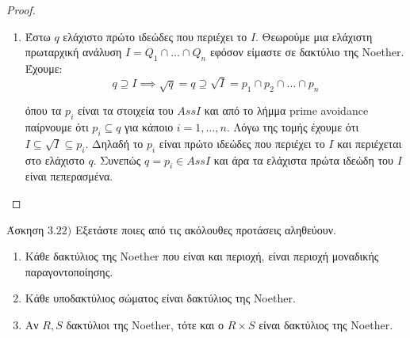 \documentclass[oneside,a4paper]{article}
\newcommand {\tl}{\textlatin}
\begin{document}
\begin{proof}
\begin{enumerate}
		
		\item Έστω $q$ ελάχιστο πρώτο ιδεώδες που περιέχει το $I$. Θεωρούμε μια ελάχιστη πρωταρχική ανάλυση $I = Q_1 \cap \ldots \cap Q_n$ εφόσον είμαστε σε δακτύλιο της \tl{Noether}. Έχουμε:
		$$ q \supseteq I \implies \sqrt{q} = q \supseteq \sqrt{I} = p_1 \cap p_2 \cap \ldots \cap p_n$$

		όπου τα $p_i$ είναι τα στοιχεία του $AssI$ και από το λήμμα \tl{prime avoidance} παίρνουμε ότι $p_i \subseteq q$ για κάποιο $i = 1,\ldots,n$. Λόγω της τομής έχουμε ότι $I \subseteq \sqrt{I} \subseteq p_i$. Δηλαδή το $p_i$ είναι πρώτο ιδεώδες που περιέχει το $I$ και περιέχεται στο ελάχιστο $q$. Συνεπώς $q=p_i \in AssI$ και άρα τα ελάχιστα πρώτα ιδεώδη του $I$ είναι πεπερασμένα.

	\end{enumerate}

\end{proof}

\pagebreak



\noindent Άσκηση $3.22)$
\quad Εξετάστε ποιες από τις ακόλουθες προτάσεις αληθεύουν.
\begin{enumerate}
	\item Κάθε δακτύλιος της \tl{Noether} που είναι και περιοχή, είναι περιοχή μοναδικής παραγοντοποίησης.
	\item Κάθε υποδακτύλιος σώματος είναι δακτύλιος της \tl{Noether}.
	\item Αν $R,S$ δακτύλιοι της \tl{Noether}, τότε και ο $R \times S$ είναι δακτύλιος της \tl{Noether}.
\end{enumerate}
\end{document}
